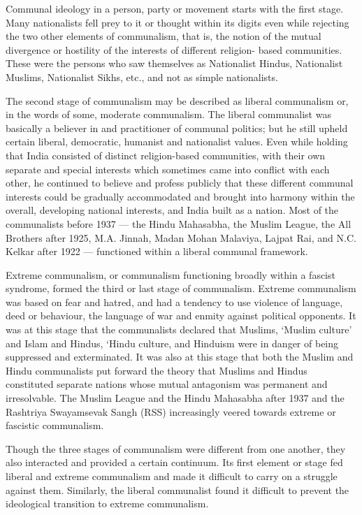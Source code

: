 Communal ideology in a person, party or movement starts with the first stage. Many nationalists fell prey to it or thought within its digits even while rejecting the two other elements of communalism, that is, the notion of the mutual divergence or hostility of the interests of different religion- based communities. These were the persons who saw themselves as Nationalist Hindus, Nationalist Muslims, Nationalist Sikhs, etc., and not as simple nationalists. 

The second stage of communalism may be described as liberal communalism or, in the words of some, moderate communalism. The liberal communalist was basically a believer in and practitioner of communal politics; but he still upheld certain liberal, democratic, humanist and nationalist values. Even while holding that India consisted of distinct religion-based communities, with their own separate and special interests which sometimes came into conflict with each other, he continued to believe and profess publicly that these different communal interests could be gradually accommodated and brought into harmony within the overall, developing national interests, and India built as a nation. Most of the communalists before 1937 — the Hindu Mahasabha, the Muslim League, the All Brothers after 1925, M.A. Jinnah, Madan Mohan Malaviya, Lajpat Rai, and N.C. Kelkar after 1922 — functioned within a liberal communal framework. 

Extreme communalism, or communalism functioning broadly within a fascist syndrome, formed the third or last stage of communalism. Extreme communalism was based on fear and hatred, and had a tendency to use violence of language, deed or behaviour, the language of war and enmity against political opponents. It was at this stage that the communalists declared that Muslims, `Muslim culture' and Islam and Hindus, `Hindu culture, and Hinduism were in danger of being suppressed and exterminated. It was also at this stage that both the Muslim and Hindu communalists put forward the theory that Muslims and Hindus constituted separate nations whose mutual antagonism was permanent and irresolvable. The Muslim League and the Hindu Mahasabha after 1937 and the Rashtriya Swayamsevak Sangh (RSS) increasingly veered towards extreme or fascistic communalism. 

Though the three stages of communalism were different from one another, they also interacted and provided a certain continuum. Its first element or stage fed liberal and extreme communalism and made it difficult to carry on a struggle against them. Similarly, the liberal communalist found it difficult to prevent the ideological transition to extreme communalism. 

